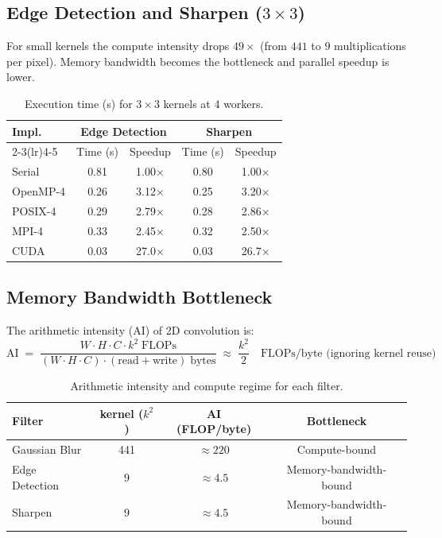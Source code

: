 \documentclass[12pt,a4paper]{article}
\begin{document}
\subsection{Edge Detection and Sharpen ($3 \times 3$)}

For small kernels the compute intensity drops $49\times$ (from $441$ to $9$
multiplications per pixel). Memory bandwidth becomes the bottleneck and
parallel speedup is lower.

\begin{table}[H]
\centering
\caption{Execution time (s) for $3\!\times\!3$ kernels at 4 workers.}
\label{tab:small-timing}
\begin{tabular}{lcccc}
\toprule
\textbf{Impl.} &
\multicolumn{2}{c}{\textbf{Edge Detection}} &
\multicolumn{2}{c}{\textbf{Sharpen}} \\
\cmidrule(lr){2-3}\cmidrule(lr){4-5}
 & Time (s) & Speedup & Time (s) & Speedup \\
\midrule
Serial   & 0.81 & 1.00$\times$ & 0.80 & 1.00$\times$ \\
OpenMP-4 & 0.26 & 3.12$\times$ & 0.25 & 3.20$\times$ \\
POSIX-4  & 0.29 & 2.79$\times$ & 0.28 & 2.86$\times$ \\
MPI-4    & 0.33 & 2.45$\times$ & 0.32 & 2.50$\times$ \\
CUDA     & 0.03 & 27.0$\times$ & 0.03 & 26.7$\times$ \\
\bottomrule
\end{tabular}
\end{table}

\subsection{Memory Bandwidth Bottleneck}

The arithmetic intensity (AI) of 2D convolution is:
\begin{equation}
  \text{AI} \;=\;
  \frac{W \cdot H \cdot C \cdot k^2 \;\text{FLOPs}}
       {(W \cdot H \cdot C) \cdot (\text{read} + \text{write}) \;\text{bytes}}
  \;\approx\;
  \frac{k^2}{2}
  \quad\text{FLOPs/byte (ignoring kernel reuse)}
\end{equation}

\begin{table}[H]
\centering
\caption{Arithmetic intensity and compute regime for each filter.}
\label{tab:ai}
\begin{tabular}{lccc}
\toprule
\textbf{Filter} & \textbf{kernel ($k^2$)} & \textbf{AI (FLOP/byte)} & \textbf{Bottleneck} \\
\midrule
Gaussian Blur   & 441 & $\approx220$ & Compute-bound \\
Edge Detection  & 9   & $\approx4.5$ & Memory-bandwidth-bound \\
Sharpen         & 9   & $\approx4.5$ & Memory-bandwidth-bound \\
\bottomrule
\end{tabular}
\end{table}
\end{document}
